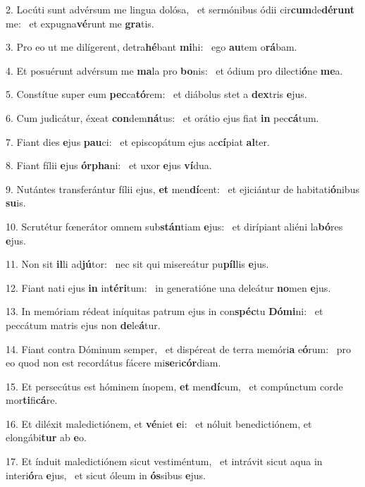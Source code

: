 2. Locúti sunt advérsum me lingua dolósa, \dag\  et sermónibus ódii cir\textbf{cum}de\textbf{dé}\textbf{runt} me: \ast\  et expugna\textbf{vé}runt me \textbf{gra}tis.\

3. Pro eo ut me dilígerent, detra\textbf{hé}bant \textbf{mi}hi: \ast\  ego \textbf{au}tem o\textbf{rá}bam.\

4. Et posuérunt advérsum me \textbf{ma}la pro \textbf{bo}nis: \ast\  et ódium pro dilecti\textbf{ó}ne \textbf{me}a.\

5. Constítue super eum \textbf{pec}ca\textbf{tó}rem: \ast\  et diábolus stet a \textbf{dex}tris \textbf{e}jus.\

6. Cum judicátur, éxeat \textbf{con}dem\textbf{ná}tus: \ast\  et orátio ejus fiat \textbf{in} pec\textbf{cá}tum.\

7. Fiant dies \textbf{e}jus \textbf{pau}ci: \ast\  et episcopátum ejus ac\textbf{cí}piat \textbf{al}ter.\

8. Fiant fílii \textbf{e}jus \textbf{ór}\textbf{pha}ni: \ast\  et uxor \textbf{e}jus \textbf{ví}dua.\

9. Nutántes transferántur fílii ejus, \textbf{et} men\textbf{dí}cent: \ast\  et ejiciántur de habitati\textbf{ó}nibus \textbf{su}is.\

10. Scrutétur fœnerátor omnem sub\textbf{stán}tiam \textbf{e}jus: \ast\  et dirípiant aliéni la\textbf{bó}res \textbf{e}jus.\

11. Non sit \textbf{il}li ad\textbf{jú}tor: \ast\  nec sit qui misereátur pu\textbf{píl}lis \textbf{e}jus.\

12. Fiant nati ejus \textbf{in} in\textbf{tér}\textbf{i}tum: \ast\  in generatióne una deleátur \textbf{no}men \textbf{e}jus.\

13. In memóriam rédeat iníquitas patrum ejus in con\textbf{spéc}tu \textbf{Dó}\textbf{mi}ni: \ast\  et peccátum matris ejus non \textbf{de}le\textbf{á}tur.\

14. Fiant contra Dóminum semper, \dag\  et dispéreat de terra memóri\textbf{a} e\textbf{ó}rum: \ast\  pro eo quod non est recordátus fácere mi\textbf{se}ri\textbf{cór}diam.\

15. Et persecútus est hóminem ínopem, \textbf{et} men\textbf{dí}cum, \ast\  et compúnctum corde mor\textbf{ti}fi\textbf{cá}re.\

16. Et diléxit maledictiónem, et \textbf{vé}niet \textbf{e}i: \ast\  et nóluit benedictiónem, et elongábi\textbf{tur} ab \textbf{e}o.\

17. Et índuit maledictiónem sicut vestiméntum, \dag\  et intrávit sicut aqua in interi\textbf{ó}ra \textbf{e}jus, \ast\  et sicut óleum in \textbf{ós}sibus \textbf{e}jus.\

